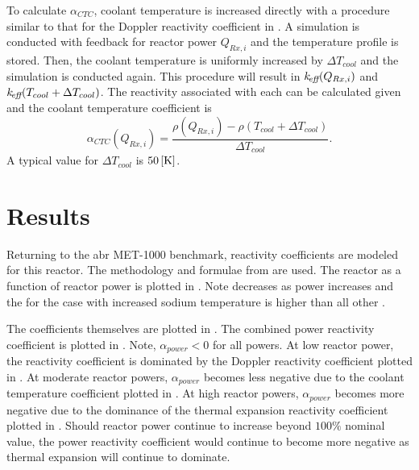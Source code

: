     To calculate $\alpha_{CTC}$, coolant temperature is increased directly with
    a procedure similar to that for the Doppler reactivity coefficient in
    . A simulation is 
    conducted with feedback for reactor power $Q_{Rx,i}$ and the temperature 
    profile is stored. Then, the coolant temperature is uniformly
    increased by $\Delta T_{cool}$ and the simulation is conducted again. This
    procedure will result in $k_{\!\mbox{\scriptsize \em eff}}(Q_{Rx,i})$ and 
    ${k_{\!\mbox{\scriptsize \em eff}}(T_{cool} + \Delta T_{cool})}$. The reactivity associated with each
    \keff can be calculated given  and the coolant
    temperature coefficient is
    \begin{equation}
      \label{eq:coolant_temperature_reactivity_coefficient}
      \alpha_{CTC}(Q_{Rx,i}) = \frac{\rho(Q_{Rx,i}) - \rho(T_{cool} + 
        \Delta T_{cool})} {\Delta T_{cool}}.
    \end{equation}
    A typical value for $\Delta T_{cool}$ is $50 \left[\text{{K}}\right]$.

\section{Results}
\label{sec:results}
  Returning to the \gls{abr} MET-1000 benchmark, reactivity coefficients are 
  modeled for this reactor. The methodology and formulae from
   are used. The reactor \keff as a function
  of reactor power is plotted in . Note \keff decreases
  as power increases and the \keff for the case with increased sodium
  temperature is higher than all other \keff.
  
  The coefficients themselves are plotted in 
  . The combined power reactivity
  coefficient is plotted in . Note,
  $\alpha_{power} < 0$ for all powers. At low reactor power, the reactivity
  coefficient is dominated by the Doppler reactivity coefficient plotted in
  . At moderate reactor powers,
  $\alpha_{power}$ becomes less negative due to the coolant temperature
  coefficient plotted in .
  At high reactor powers, $\alpha_{power}$ becomes more negative due to the
  dominance of the thermal expansion reactivity coefficient plotted in
  . Should reactor power
  continue to increase beyond $100\%$ nominal value, the power reactivity
  coefficient would continue to become more negative as thermal expansion will
  continue to dominate.

